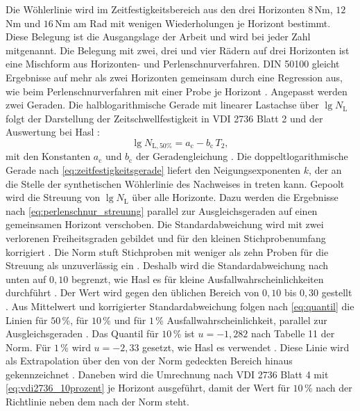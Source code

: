 Die Wöhlerlinie wird im Zeitfestigkeitsbereich aus den drei Horizonten $8$\,Nm, $12$\,Nm und $16$\,Nm am Rad mit wenigen Wiederholungen je Horizont bestimmt. Diese Belegung ist die Ausgangslage der Arbeit und wird bei jeder Zahl mitgenannt. Die Belegung mit zwei, drei und vier Rädern auf drei Horizonten ist eine Mischform aus Horizonten- und Perlenschnurverfahren. DIN 50100 gleicht Ergebnisse auf mehr als zwei Horizonten gemeinsam durch eine Regression aus, wie beim Perlenschnurverfahren mit einer Probe je Horizont \cite[Abschnitt~10.2.3, S.~57]{DIN50100}. Angepasst werden zwei Geraden. Die halblogarithmische Gerade mit linearer Lastachse über $\lg N_{\mathrm{L}}$ folgt der Darstellung der Zeitschwellfestigkeit in VDI 2736 Blatt 2 und der Auswertung bei Hasl \cite[S.~107]{Has18}:
\begin{equation}
    \lg N_{\mathrm{L},50\%} = a_{\mathrm{c}} - b_{\mathrm{c}}\,T_{2} ,
    \label{eq:halblog_gerade}
\end{equation}
mit den Konstanten $a_{\mathrm{c}}$ und $b_{\mathrm{c}}$ der Geradengleichung \cite[S.~XIII und 110]{Has18}. Die doppeltlogarithmische Gerade nach \eqref{eq:zeitfestigkeitsgerade} liefert den Neigungsexponenten $k$, der an die Stelle der synthetischen Wöhlerlinie des Nachweises in  treten kann. Gepoolt wird die Streuung von $\lg N_{\mathrm{L}}$ über alle Horizonte. Dazu werden die Ergebnisse nach \eqref{eq:perlenschnur_streuung} parallel zur Ausgleichsgeraden auf einen gemeinsamen Horizont verschoben. Die Standardabweichung wird mit zwei verlorenen Freiheitsgraden gebildet und für den kleinen Stichprobenumfang korrigiert \cite[Abschnitt~10.2.2, S.~56 bis 57]{DIN50100}. Die Norm stuft Stichproben mit weniger als zehn Proben für die Streuung als unzuverlässig ein \cite[S.~30]{DIN50100}. Deshalb wird die Standardabweichung nach unten auf $0{,}10$ begrenzt, wie Hasl es für kleine Ausfallwahrscheinlichkeiten durchführt \cite[S.~118]{Has18}. Der Wert wird gegen den üblichen Bereich von $0{,}10$ bis $0{,}30$ gestellt \cite[S.~30]{DIN50100}. Aus Mittelwert und korrigierter Standardabweichung folgen nach \eqref{eq:quantil} die Linien für $50$\,\%, für $10$\,\% und für $1$\,\% Ausfallwahrscheinlichkeit, parallel zur Ausgleichsgeraden \cite[S.~63]{DIN50100}. Das Quantil für $10$\,\% ist $u = -1{,}282$ nach Tabelle 11 der Norm. Für $1$\,\% wird $u = -2{,}33$ gesetzt, wie Hasl es verwendet \cite[S.~9]{Has18}. Diese Linie wird als Extrapolation über den von der Norm gedeckten Bereich hinaus gekennzeichnet \cite[S.~29]{DIN50100}. Daneben wird die Umrechnung nach VDI 2736 Blatt 4 mit \eqref{eq:vdi2736_10prozent} je Horizont ausgeführt, damit der Wert für $10$\,\% nach der Richtlinie neben dem nach der Norm steht.

